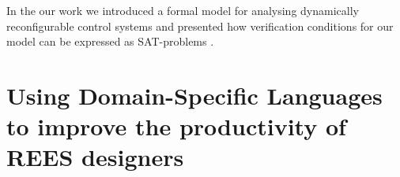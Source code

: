 \documentclass[conference]{IEEEtran}
\begin{document}
In the our work we introduced a formal model for analysing dynamically reconfigurable control
systems \cite{mokhov2008conditional} and presented how verification conditions for our
model can be expressed as SAT-problems \cite{mokhov2008verification}. 







\newpage
\section{Using Domain-Specific Languages to improve the 
productivity of REES designers}
\end{document}
